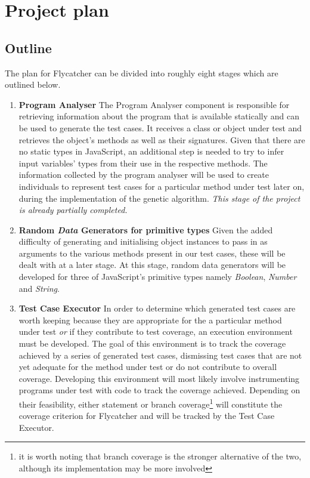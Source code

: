 \documentclass[a4paper,11pt,titlepage]{report}
\begin{document}
\chapter{Project plan}

\section{Outline}
\label{sec:project_outline}
The plan for \textsf{Flycatcher} can be divided into roughly eight stages which are outlined below.

\begin{enumerate}
	
	\item{\textbf{Program Analyser}} The Program Analyser component is responsible for retrieving information about the program that is available statically and can be used to generate the test cases. It receives a class or object under test and retrieves the object's methods as well as their signatures. Given that there are no static types in JavaScript, an additional step is needed to try to infer input variables' types from their use in the respective methods. The information collected by the program analyser will be used to create individuals to represent test cases for a particular method under test later on, during the implementation of the genetic algorithm. \emph{This stage of the project is already partially completed.}
	 
	\item{\textbf{Random \emph{Data} Generators for primitive types}} Given the added difficulty of generating and initialising object instances to pass in as arguments to the various methods present in our test cases, these will be dealt with at a later stage. At this stage, random data generators will be developed for three of JavaScript's primitive types namely \emph{Boolean}, \emph{Number} and \emph{String}.

	\item{\textbf{Test Case Executor}} In order to determine which generated test cases are worth keeping because they are appropriate for the a particular method under test \emph{or} if they contribute to test coverage, an execution environment must be developed. The goal of this environment is to track the coverage achieved by a series of generated test cases, dismissing test cases that are not yet adequate for the method under test or do not contribute to overall coverage. Developing this environment will most likely involve instrumenting programs under test with code to track the coverage achieved. Depending on their feasibility, either statement or branch coverage\footnote{it is worth noting that branch coverage is the stronger alternative of the two, although its implementation may be more involved} will constitute the coverage criterion for \textsf{Flycatcher} and will be tracked by the Test Case Executor.


\end{enumerate}
\end{document}
